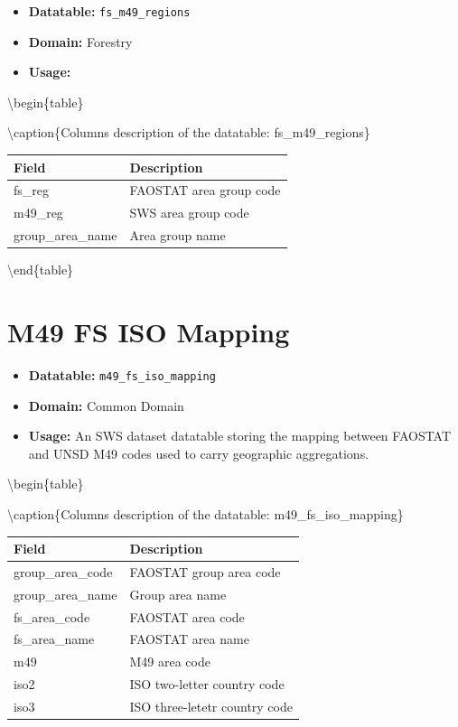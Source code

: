 \documentclass[
]{book}
\providecommand{\tightlist}{%
  \setlength{\itemsep}{0pt}\setlength{\parskip}{0pt}}
\begin{document}
\begin{itemize}
\tightlist
\item
  \textbf{Datatable:} \texttt{fs\_m49\_regions}
\item
  \textbf{Domain:} Forestry
\item
  \textbf{Usage:}
\end{itemize}

\textbackslash begin\{table\}

\textbackslash caption\{\label{tab:fsm49regions}Columns description of the datatable: fs\_m49\_regions\}
\centering
\fontsize{14}{16}\selectfont

\begin{tabular}[t]{l|l}
\hline
\rowcolor[HTML]{a9c9a7}  Field & Description\\
\hline
fs\_reg & FAOSTAT area group code\\
\hline
m49\_reg & SWS area group code\\
\hline
group\_area\_name & Area group name\\
\hline
\end{tabular}

\textbackslash end\{table\}

\hypertarget{m49-fs-iso-mapping}{%
\section*{M49 FS ISO Mapping}\label{m49-fs-iso-mapping}}

\begin{itemize}
\tightlist
\item
  \textbf{Datatable:} \texttt{m49\_fs\_iso\_mapping}
\item
  \textbf{Domain:} Common Domain
\item
  \textbf{Usage:} An SWS dataset datatable storing the mapping between FAOSTAT and UNSD M49 codes used to carry geographic aggregations.
\end{itemize}

\textbackslash begin\{table\}

\textbackslash caption\{\label{tab:m49fsisomapping}Columns description of the datatable: m49\_fs\_iso\_mapping\}
\centering
\fontsize{14}{16}\selectfont

\begin{tabular}[t]{l|l}
\hline
\rowcolor[HTML]{a9c9a7}  Field & Description\\
\hline
group\_area\_code & FAOSTAT group area code\\
\hline
group\_area\_name & Group area name\\
\hline
fs\_area\_code & FAOSTAT area code\\
\hline
fs\_area\_name & FAOSTAT area name\\
\hline
m49 & M49 area code\\
\hline
iso2 & ISO two-letter country code\\
\hline
iso3 & ISO three-letetr country code\\
\hline
\end{tabular}
\end{document}
